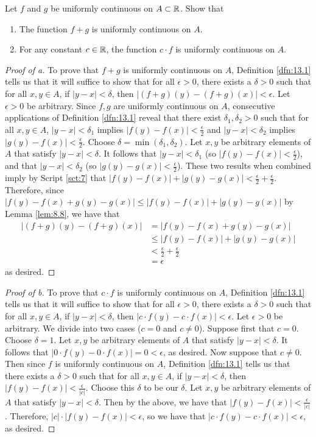 \documentclass[../main.tex]{subfiles}
\begin{document}
\begin{exercise}\label{exr:13.5}
    Let $f$ and $g$ be uniformly continuous on $A\subset\mathbb{R}$. Show that
    \begin{enumerate}[label={(\alph*)}]
        \item The function $f+g$ is uniformly continuous on $A$.
        \item For any constant $c\in\mathbb{R}$, the function $c\cdot f$ is uniformly continuous on $A$.
    \end{enumerate}
    \begin{proof}[Proof of a]
        To prove that $f+g$ is uniformly continuous on $A$, Definition \ref{dfn:13.1} tells us that it will suffice to show that for all $\epsilon>0$, there exists a $\delta>0$ such that for all $x,y\in A$, if $|y-x|<\delta$, then $|(f+g)(y)-(f+g)(x)|<\epsilon$. Let $\epsilon>0$ be arbitrary. Since $f,g$ are uniformly continuous on $A$, consecutive applications of Definition \ref{dfn:13.1} reveal that there exist $\delta_1,\delta_2>0$ such that for all $x,y\in A$, $|y-x|<\delta_1$ implies $|f(y)-f(x)|<\frac{\epsilon}{2}$ and $|y-x|<\delta_2$ implies $|g(y)-f(x)|<\frac{\epsilon}{2}$. Choose $\delta=\min(\delta_1,\delta_2)$. Let $x,y$ be arbitrary elements of $A$ that satisfy $|y-x|<\delta$. It follows that $|y-x|<\delta_1$ (so $|f(y)-f(x)|<\frac{\epsilon}{2}$), and that $|y-x|<\delta_2$ (so $|g(y)-g(x)|<\frac{\epsilon}{2}$). These two results when combined imply by Script \ref{sct:7} that $|f(y)-f(x)|+|g(y)-g(x)|<\frac{\epsilon}{2}+\frac{\epsilon}{2}$. Therefore, since $|f(y)-f(x)+g(y)-g(x)|\leq|f(y)-f(x)|+|g(y)-g(x)|$ by Lemma \ref{lem:8.8}, we have that
        \begin{align*}
            |(f+g)(y)-(f+g)(x)| &= |f(y)-f(x)+g(y)-g(x)|\\
            &\leq |f(y)-f(x)|+|g(y)-g(x)|\\
            &< \frac{\epsilon}{2}+\frac{\epsilon}{2}\\
            &= \epsilon
        \end{align*}
        as desired.
    \end{proof}
    \begin{proof}[Proof of b]
        To prove that $c\cdot f$ is uniformly continuous on $A$, Definition \ref{dfn:13.1} tells us that it will suffice to show that for all $\epsilon>0$, there exists a $\delta>0$ such that for all $x,y\in A$, if $|y-x|<\delta$, then $|c\cdot f(y)-c\cdot f(x)|<\epsilon$. Let $\epsilon>0$ be arbitrary. We divide into two cases ($c=0$ and $c\neq 0$). Suppose first that $c=0$. Choose $\delta=1$. Let $x,y$ be arbitrary elements of $A$ that satisfy $|y-x|<\delta$. It follows that $|0\cdot f(y)-0\cdot f(x)|=0<\epsilon$, as desired. Now suppose that $c\neq 0$. Then since $f$ is uniformly continuous on $A$, Definition \ref{dfn:13.1} tells us that there exists a $\delta>0$ such that for all $x,y\in A$, if $|y-x|<\delta$, then $|f(y)-f(x)|<\frac{\epsilon}{|c|}$. Choose this $\delta$ to be our $\delta$. Let $x,y$ be arbitrary elements of $A$ that satisfy $|y-x|<\delta$. Then by the above, we have that $|f(y)-f(x)|<\frac{\epsilon}{|c|}$. Therefore, $|c|\cdot|f(y)-f(x)|<\epsilon$, so we have that $|c\cdot f(y)-c\cdot f(x)|<\epsilon$, as desired.
    \end{proof}
\end{exercise}
\end{document}
